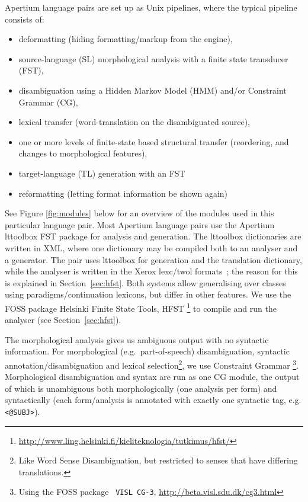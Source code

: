 \documentclass{book}
\begin{document}
Apertium language pairs are set up as Unix pipelines, where the
typical pipeline consists of:

\begin{itemize}
\item deformatting (hiding formatting/markup from the engine),
\item source-language (SL) morphological analysis with a finite state
  transducer (FST),
\item disambiguation using a Hidden Markov Model (HMM) and/or
  Constraint Grammar (CG), 
\item lexical transfer (word-translation on the disambiguated source),
\item one or more levels of finite-state based structural transfer
  (reordering, and changes to morphological features),
\item target-language (TL) generation with an FST
\item reformatting (letting format information be shown again)
\end{itemize}

See Figure \ref{fig:modules} below for an overview of the modules used
in this particular language pair. Most Apertium language pairs use the
Apertium lttoolbox FST package for analysis and generation. The
lttoolbox dictionaries are written in XML, where one dictionary may be
compiled both to an analyser and a generator. The \smenob{} pair uses
lttoolbox for \nob{} generation and the translation dictionary, while
the \sme{} analyser is written in the Xerox lexc/twol
formats~\citep{beesley2003fsm}; the reason for this is explained in
Section~\ref{sec:hfst}. Both systems allow generalising over classes
using paradigms/continuation lexicons, but differ in other features.
We use the FOSS package Helsinki Finite State Tools, HFST
\citep{linden2011hfst}\footnote{\href{http://www.ling.helsinki.fi/kieliteknologia/tutkimus/hfst/}{http://www.ling.helsinki.fi/kieliteknologia/tutkimus/hfst/}}
to compile and run the analyser (see Section~\ref{sec:hfst}).

The morphological analysis gives us ambiguous output with no syntactic
information. For morphological (e.g.~part-of-speech) disambiguation,
syntactic annotation/disambiguation and lexical
selection\footnote{Like Word Sense Disambiguation, but restricted to
  senses that have differing translations.}, we use Constraint Grammar
\citep{karlsson1990cgf}\footnote{Using the FOSS package {\tt \small
    VISL CG-3},
  \href{http://beta.visl.sdu.dk/cg3.html}{http://beta.visl.sdu.dk/cg3.html}}.
Morphological disambiguation and syntax are run as one CG module, the
output of which is unambiguous both morphologically (one analysis per
form) and syntactically (each form/analysis is annotated with exactly
one syntactic tag, e.g. \texttt{<@SUBJ>}).
\end{document}

